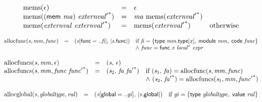 $$
\begin{array}{@{}lcl@{}l@{}}
{\mathrm{mems}}(\epsilon) &=& \epsilon &  \\
{\mathrm{mems}}((\mathsf{mem}~{\mathit{ma}})~{{\mathit{externval}'}^\ast}) &=& {\mathit{ma}}~{\mathrm{mems}}({{\mathit{externval}'}^\ast}) &  \\
{\mathrm{mems}}({\mathit{externval}}~{{\mathit{externval}'}^\ast}) &=& {\mathrm{mems}}({{\mathit{externval}'}^\ast}) &\quad
  \mbox{otherwise} \\
\end{array}
$$

\vspace{1ex}

\vspace{1ex}

$$
\begin{array}{@{}lcl@{}l@{}}
{\mathrm{allocfunc}}({\mathit{s}}, {\mathit{mm}}, {\mathit{func}}) &=& ({\mathit{s}}[\mathsf{func} = ..{\mathit{fi}}],\, {|{\mathit{s}}.\mathsf{func}|}) &\quad
  \mbox{if}~{\mathit{fi}} = \{ \begin{array}[t]{@{}l@{}}
\mathsf{type}~{\mathit{mm}}.\mathsf{type}[{\mathit{x}}],\; \mathsf{module}~{\mathit{mm}},\; \mathsf{code}~{\mathit{func}} \}\end{array} \\
 &&&\quad {\land}~{\mathit{func}} = \mathsf{func}~{\mathit{x}}~{{\mathit{local}}^\ast}~{\mathit{expr}} \\
\end{array}
$$

$$
\begin{array}{@{}lcl@{}l@{}}
{\mathrm{allocfuncs}}({\mathit{s}}, {\mathit{mm}}, \epsilon) &=& ({\mathit{s}},\, \epsilon) &  \\
{\mathrm{allocfuncs}}({\mathit{s}}, {\mathit{mm}}, {\mathit{func}}~{{\mathit{func}'}^\ast}) &=& ({\mathit{s}}_{{2}},\, {\mathit{fa}}~{{\mathit{fa}'}^\ast}) &\quad
  \mbox{if}~({\mathit{s}}_{{1}},\, {\mathit{fa}}) = {\mathrm{allocfunc}}({\mathit{s}}, {\mathit{mm}}, {\mathit{func}}) \\
 &&&\quad {\land}~({\mathit{s}}_{{2}},\, {{\mathit{fa}'}^\ast}) = {\mathrm{allocfuncs}}({\mathit{s}}_{{1}}, {\mathit{mm}}, {{\mathit{func}'}^\ast}) \\
\end{array}
$$

$$
\begin{array}{@{}lcl@{}l@{}}
{\mathrm{allocglobal}}({\mathit{s}}, {\mathit{globaltype}}, {\mathit{val}}) &=& ({\mathit{s}}[\mathsf{global} = ..{\mathit{gi}}],\, {|{\mathit{s}}.\mathsf{global}|}) &\quad
  \mbox{if}~{\mathit{gi}} = \{ \begin{array}[t]{@{}l@{}}
\mathsf{type}~{\mathit{globaltype}},\; \mathsf{value}~{\mathit{val}} \}\end{array} \\
\end{array}
$$

